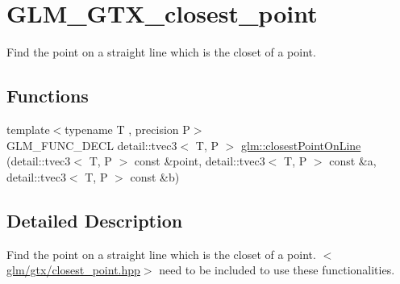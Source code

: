\hypertarget{group__gtx__closest__point}{\section{G\-L\-M\-\_\-\-G\-T\-X\-\_\-closest\-\_\-point}
\label{group__gtx__closest__point}
}


Find the point on a straight line which is the closet of a point.  


\subsection*{Functions}
\begin{DoxyCompactItemize}
\item 
{\footnotesize template$<$typename T , precision P$>$ }\\G\-L\-M\-\_\-\-F\-U\-N\-C\-\_\-\-D\-E\-C\-L detail\-::tvec3$<$ T, P $>$ \hyperlink{group__gtx__closest__point_ga03a6d7e93590f5d45050f6dc7aa8bf8f}{glm\-::closest\-Point\-On\-Line} (detail\-::tvec3$<$ T, P $>$ const \&point, detail\-::tvec3$<$ T, P $>$ const \&a, detail\-::tvec3$<$ T, P $>$ const \&b)
\end{DoxyCompactItemize}


\subsection{Detailed Description}
Find the point on a straight line which is the closet of a point. $<$\hyperlink{closest__point_8hpp_source}{glm/gtx/closest\-\_\-point.\-hpp}$>$ need to be included to use these functionalities. 

